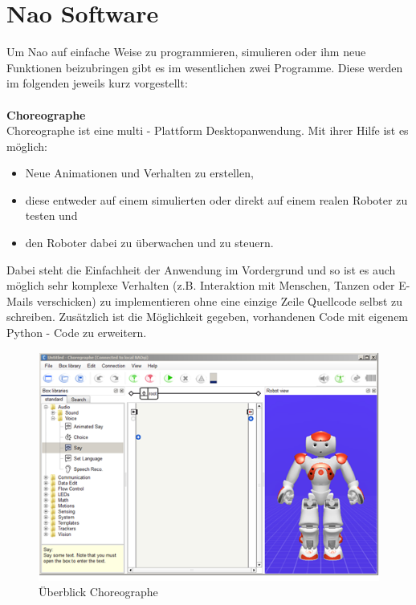 \section{Nao Software}
Um Nao auf einfache Weise zu programmieren, simulieren oder ihm neue Funktionen beizubringen gibt es im wesentlichen zwei Programme. Diese werden im folgenden jeweils kurz vorgestellt:
\\
\\
\noindent
\textbf{Choreographe} 
\\
Choreographe ist eine multi - Plattform Desktopanwendung. Mit ihrer Hilfe ist es möglich:
\begin{itemize}
\item Neue Animationen und Verhalten zu erstellen,
\item diese entweder auf einem simulierten  oder direkt auf einem realen Roboter zu testen und
\item den Roboter dabei zu überwachen und zu steuern.
\end{itemize}
Dabei steht die Einfachheit der Anwendung im Vordergrund und so ist es auch möglich sehr komplexe Verhalten (z.B. Interaktion mit Menschen, Tanzen oder E-Mails verschicken) zu implementieren ohne eine einzige Zeile Quellcode selbst zu schreiben. Zusätzlich ist die Möglichkeit gegeben, vorhandenen Code mit eigenem Python - Code zu erweitern.

\begin{figure}[H]						
	\centering							
	\includegraphics[scale=1.0]{Bilder/choreographe.png}			
	\caption{Überblick Choreographe}						
	\label{f:nao_choreographe}						
\end{figure}

